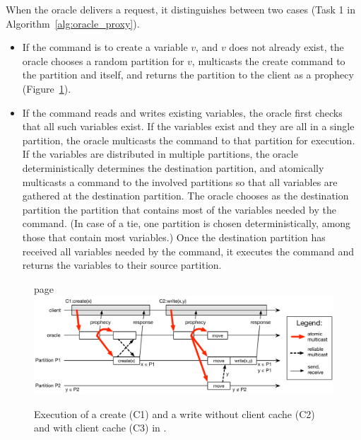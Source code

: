When the oracle delivers a request, it distinguishes between two cases (Task 1
in Algorithm~\ref{alg:oracle_proxy}).
\begin{itemize}
\item If the command is to create a variable $v$, and $v$ does not already
exist, the oracle chooses a random partition for $v$, multicasts the create
command to the partition and itself, and returns the partition to the client as
a prophecy (Figure~\ref{fig:oracle_repartition}).
\item If the command reads and writes existing variables, the oracle first
checks that all such variables exist. If the variables exist and they are all in
a single partition, the oracle multicasts the command to that partition for
execution. If the variables are distributed in multiple partitions, the oracle
deterministically determines the destination partition, and atomically
multicasts a command to the involved partitions so that all variables are
gathered at the destination partition. The oracle chooses as the destination
partition the partition that contains most of the variables needed by the
command. (In case of a tie, one partition is chosen deterministically, among
those that contain most variables.) Once the destination partition has received
all variables needed by the command, it executes the command and returns the
variables to their source partition.

\end{itemize}


\begin{figure}
\begin{minipage}[b]{1\linewidth} %
page
\centering
      \includegraphics[width=0.9\linewidth]{figures/dynastar}
\end{minipage}
\caption{Execution of a create (C1) and a write without client cache (C2) and with client cache (C3) in \dynastar.}
\label{fig:oracle_repartition}
\end{figure}

